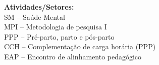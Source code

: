 {\fontsize{10pt}{12pt}\selectfont
\noindent
\textbf{Atividades/Setores:}\\
SM – Saúde Mental\\
MPI – Metodologia de pesquisa I\\
PPP – Pré-parto, parto e pós-parto\\
CCH – Complementação de carga horária (PPP)\\
EAP – Encontro de alinhamento pedagógico\\
}